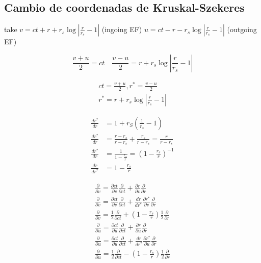 \subsection{Cambio de coordenadas de Kruskal-Szekeres}

take
$v=c t+r+r_s \log \left|\frac{r}{r_s}-1\right|$ (ingoing EF) $u=c t-r-r_s \log \left|\frac{r}{r_s}-1\right|$ (outgoing EF)


\begin{equation}
    \frac{v+u}{2}=c t \quad \frac{v-u}{2}=r+r_s \log \left|\frac{r}{r_s}-1\right|
\end{equation}

\begin{equation}
    \begin{array}{l}
        c t=\frac{v+u}{2}, r^*=\frac{v-u}{2} \\
        r^*=r+r_s \log \left|\frac{r}{r_s}-1\right|
    \end{array}
\end{equation}

\begin{equation}
    \begin{aligned}
        \frac{d r^*}{d r} & =1+r_S\left(\frac{1}{r_s}-1\right)                           \\
        \frac{d r^*}{d r} & =\frac{r-r_s}{r-r_s}+\frac{r_s}{r-r_s}=\frac{r}{r-r_s}       \\
        \frac{d r^*}{d r} & =\frac{1}{1-\frac{r_s}{r}}=\left(1-\frac{r_s}{r}\right)^{-1} \\
        \frac{d r}{d r^*} & =1-\frac{r_s}{r}
    \end{aligned}
\end{equation}

\begin{equation}
    \begin{array}{l}
        \frac{\partial}{\partial v}=\frac{\partial c t}{\partial v} \frac{\partial}{\partial c t}+\frac{\partial r}{\partial v} \frac{\partial}{\partial r}                     \\
        \frac{\partial}{\partial v}=\frac{\partial c t}{\partial v} \frac{\partial}{\partial c t}+\frac{d r}{d r^*} \frac{\partial r^*}{\partial v} \frac{\partial}{\partial r} \\
        \frac{\partial}{\partial v}=\frac{1}{2} \frac{\partial}{\partial c t}+\left(1-\frac{r_s}{r}\right) \frac{1}{2} \frac{\partial}{\partial r}                              \\
        \frac{\partial}{\partial u}=\frac{\partial c t}{\partial u} \frac{\partial}{\partial c t}+\frac{\partial r}{\partial u} \frac{\partial}{\partial r}                     \\
        \frac{\partial}{\partial u}=\frac{\partial c t}{\partial u} \frac{\partial}{\partial c t}+\frac{d r}{d r^*} \frac{\partial r^*}{\partial u} \frac{\partial}{\partial r} \\
        \frac{\partial}{\partial u}=\frac{1}{2} \frac{\partial}{\partial c t}-\left(1-\frac{r_s}{r}\right) \frac{1}{2} \frac{\partial}{\partial r}
    \end{array}
\end{equation}



